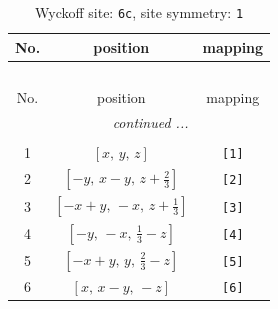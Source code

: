 \documentclass[fleqn,8pt]{jsarticle}
\begin{document}
\renewcommand{\arraystretch}{1.2}
\begin{longtable}{ccc}
\caption{Wyckoff site: {\tt 6c}, site symmetry: {\tt 1}}
 \\
 \hline \hline
No. & position & mapping \\ \hline \endfirsthead

\multicolumn{2}{l}{\tablename\ \thetable{}} \\
 \hline \hline
No. & position & mapping \\ \hline \endhead

 \hline \hline
\multicolumn{2}{r}{\footnotesize\it continued ...} \\ \endfoot

 \hline \hline
\multicolumn{2}{r}{} \\ \endlastfoot

1 & $\left[ x,\, y,\, z \right]$ & {\tt [1]} \\ \hline
2 & $\left[ - y,\, x - y,\, z + \frac{2}{3} \right]$ & {\tt [2]} \\ \hline
3 & $\left[ - x + y,\, - x,\, z + \frac{1}{3} \right]$ & {\tt [3]} \\ \hline
4 & $\left[ - y,\, - x,\, \frac{1}{3} - z \right]$ & {\tt [4]} \\ \hline
5 & $\left[ - x + y,\, y,\, \frac{2}{3} - z \right]$ & {\tt [5]} \\ \hline
6 & $\left[ x,\, x - y,\, - z \right]$ & {\tt [6]} \\
\end{longtable}
\end{document}
